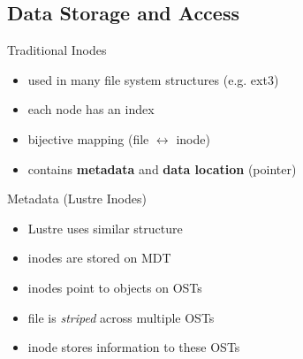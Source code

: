 \subsection{Data Storage and Access}

\begin{frame}{Traditional Inodes}
    \begin{itemize}
        \item used in many file system structures (e.g. ext3)
        \item each node has an index
        \item bijective mapping (file $\leftrightarrow$ inode)
        \item contains \textbf{metadata} and \textbf{data location} (pointer)
    \end{itemize}
\end{frame}

\begin{frame}{Metadata (Lustre Inodes)}
    \begin{itemize}
        \item Lustre uses similar structure
        \item inodes are stored on MDT
        \item inodes point to objects on OSTs
        \item file is \emph{striped} across multiple OSTs
        \item inode stores information to these OSTs
    \end{itemize}
\end{frame}

